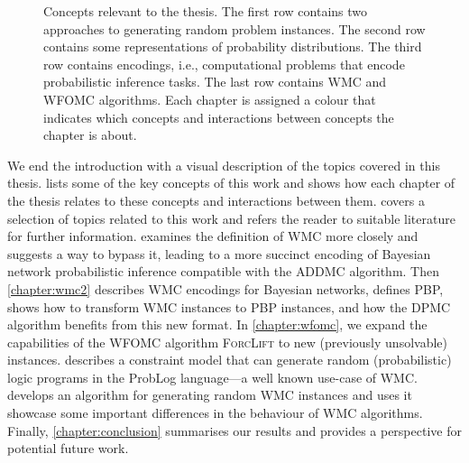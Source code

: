 \begin{figure}[t]
  \caption{Concepts relevant to the thesis. The first row contains two
    approaches to generating random problem instances. The second row contains
    some representations of probability distributions. The third row contains
    encodings, i.e., computational problems that encode probabilistic inference
    tasks. The last row contains WMC and WFOMC algorithms. Each chapter is
    assigned a colour that indicates which concepts and interactions between
    concepts the chapter is about.}\label{fig:overview}
\end{figure}

We end the introduction with a visual description of the topics covered in this
thesis.  lists some of the key concepts of this work and
shows how each chapter of the thesis relates to these concepts and interactions
between them.  covers a selection of topics related to
this work and refers the reader to suitable literature for further information.
 examines the definition of WMC more closely and suggests a
way to bypass it, leading to a more succinct encoding of Bayesian network
probabilistic inference compatible with the \textsc{ADDMC} algorithm. Then
\cref{chapter:wmc2} describes WMC encodings for Bayesian networks, defines PBP,
shows how to transform WMC instances to PBP instances, and how the \textsc{DPMC}
algorithm benefits from this new format. In \cref{chapter:wfomc}, we expand the
capabilities of the WFOMC algorithm \textsc{ForcLift} to new (previously
unsolvable) instances.  describes a constraint model
that can generate random (probabilistic) logic programs in the ProbLog
\citep{DBLP:conf/ijcai/RaedtKT07} language---a well known use-case of WMC\@.
 develops an algorithm for generating random WMC
instances and uses it showcase some important differences in the behaviour of
WMC algorithms. Finally, \cref{chapter:conclusion} summarises our results and
provides a perspective for potential future work.
